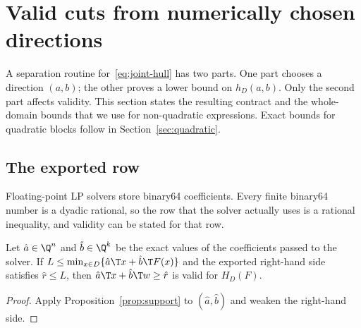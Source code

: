 \section{Valid cuts from numerically chosen directions}\label{sec:certification}

A separation routine for~\eqref{eq:joint-hull} has two parts. One part
chooses a direction $(a,b)$; the other proves a lower bound on
$h_D(a,b)$. Only the second part affects validity. This section states
the resulting contract and the whole-domain bounds that we use for
non-quadratic expressions. Exact bounds for quadratic blocks follow in
Section~\ref{sec:quadratic}.

\subsection{The exported row}\label{sec:exported-row}

Floating-point LP solvers store binary64 coefficients. Every finite
binary64 number is a dyadic rational, so the row that the solver
actually uses is a rational inequality, and validity can be stated for
that row.

\begin{proposition}\label{prop:exported-row}
Let $\hat a\in\Q^n$ and $\hat b\in\Q^k$ be the exact values of the
coefficients passed to the solver. If
$L\le\min_{x\in D}\{\hat a\T x+\hat b\T F(x)\}$ and the exported
right-hand side satisfies $\hat r\le L$, then
$\hat a\T x+\hat b\T w\ge\hat r$ is valid for $H_D(F)$.
\end{proposition}

\begin{proof}
Apply Proposition~\ref{prop:support} to $(\hat a,\hat b)$ and weaken
the right-hand side.
\end{proof}

